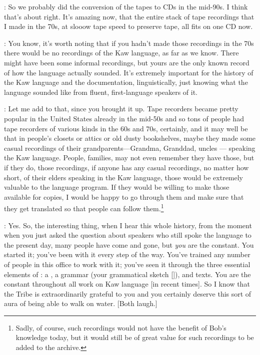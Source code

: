 \documentclass[output=paper]{LSP/langsci}
\begin{document}
: So we probably did the conversion of the tapes to CDs in the mid-90s. I think that's about right. It's amazing now, that the entire stack of tape recordings that I made in the 70s, at slooow tape speed to preserve tape, all fits on one CD now.

: You know, it's worth noting that if you hadn't made those recordings in the 70s there would be no recordings of the Kaw language, as far as we know. There might have been some informal recordings, but yours are the only known record of how the language actually sounded. It's extremely important for the history of the Kaw language and the documentation, linguistically, just knowing what the language sounded like from fluent, first-language speakers of it.

: Let me add to that, since you brought it up. Tape recorders became pretty popular in the United States already in the mid-50s and so tons of people had tape recorders of various kinds in the 60s and 70s, certainly, and it may well be that in people's closets or attics or old dusty bookshelves, maybe they made some casual recordings of their grandparents---Grandma, Granddad, uncles --- speaking the Kaw language. People, families, may not even remember they have those, but if they do, those recordings, if anyone has any casual recordings, no matter how short, of their elders speaking in the Kaw language, those would be extremely valuable to the language program. If they would be willing to make those available for copies, I would be happy to go through them and make sure that they get translated so that people can follow them.\footnote{Sadly, of course, such recordings would not have the benefit of Bob's knowledge today, but it would still be of great value for such recordings to be added to the archive.}

: Yes. So, the interesting thing, when I hear this whole history, from the moment when you just asked the question about speakers who still spoke the language to the present day, many people have come and gone, but \textit{you} are the constant. You started it; you've been with it every step of the way. You've trained any number of people in this office to work with it; you've seen it through the three essential elements of : a , a grammar (your grammatical sketch [\citealt{Rankin1989}]), and texts. You are the constant throughout all work on Kaw language [in recent times]. So I know that the Tribe is extraordinarily grateful to you and you certainly deserve this sort of aura of being able to walk on water. [Both laugh.]
\end{document}
